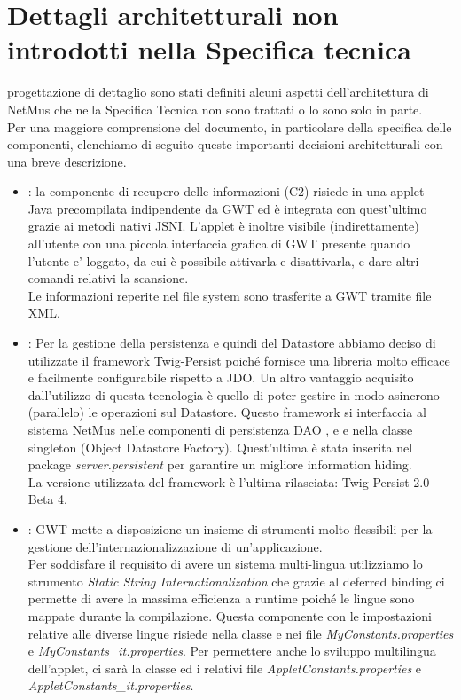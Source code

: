 \chapter{Dettagli architetturali non introdotti nella Specifica tecnica}
\thispagestyle{fancy} %
progettazione di dettaglio sono stati definiti alcuni aspetti dell'architettura
di NetMus che nella Specifica Tecnica non sono trattati o lo sono solo in
parte.\\ Per una maggiore comprensione del documento, in particolare della
specifica delle componenti, elenchiamo di seguito queste importanti decisioni
architetturali con una breve descrizione.
\begin{itemize}
  \item {} : la componente di recupero delle informazioni (C2) risiede
  in una applet \\Java precompilata indipendente da GWT ed \`e integrata con
  quest'ultimo grazie ai metodi nativi JSNI. L'applet \`e inoltre visibile
  (indirettamente) all'utente con una piccola interfaccia grafica di GWT
  presente quando l'utente e' loggato, da cui \`e possibile
  attivarla e disattivarla, e dare altri comandi relativi la scansione.\\ Le
  informazioni reperite nel file system sono trasferite a GWT tramite file XML.
  
  \item {} : Per la gestione della persistenza e quindi del
  Datastore abbiamo deciso di utilizzate il framework Twig-Persist poich\'e
  fornisce una libreria molto efficace e facilmente configurabile
  rispetto a JDO. Un altro vantaggio acquisito dall'utilizzo di questa
  tecnologia \`e quello di poter gestire in modo asincrono (parallelo) le
  operazioni sul Datastore. Questo framework si interfaccia al sistema NetMus
  nelle componenti di persistenza DAO ,  e
   e nella classe singleton  (Object Datastore
  Factory). Quest'ultima \`e stata inserita nel package \emph{server.persistent}
  per garantire un migliore information hiding. \\
  La versione utilizzata del framework \`e l'ultima rilasciata: Twig-Persist 2.0
  Beta 4.
  
  \item {} : GWT mette a disposizione un insieme di
  strumenti molto flessibili per la gestione dell'internazionalizzazione di
  un'applicazione.\\ Per soddisfare il requisito di avere un sistema
  multi-lingua utilizziamo lo strumento \emph{Static String
  Internationalization} che grazie al deferred binding ci permette di avere la
  massima efficienza a runtime poich\'e le lingue sono mappate durante la
  compilazione. Questa componente con le impostazioni relative alle
  diverse lingue risiede nella classe  e nei file
  \emph{MyConstants.properties} e \emph{MyConstants\_it.properties}. Per
  permettere anche lo sviluppo multilingua dell'applet, ci sar\`a la classe
   ed i relativi file \emph{AppletConstants.properties} e
  \emph{AppletConstants\_it.properties}.
\end{itemize}

